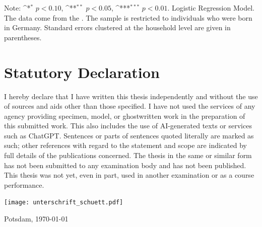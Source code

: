 \documentclass[a4paper, oneside, hyperfootnotes = false]{article}
\def\sym#1{\ifmmode^{#1}\else\(^{#1}\)\fi}
\begin{document}
{\begin{table}[ht]
\begin{center}
		\vspace{2mm}
		
		\parbox{10cm}{
			\linespread{1}\footnotesize Note: \sym{*} \(p<0.10\), \sym{**} \(p<0.05\), \sym{***} \(p<0.01\). Logistic Regression Model. The data come from the \cite{SOEP2023}. The sample is restricted to individuals who were born in Germany. Standard errors clustered at the household level are given in parentheses.}
		
	\end{center}
\end{table}

\clearpage

}
{\fontsize{11pt}{11pt}\selectfont

{}
\section*{Statutory Declaration}
\label{declarations}

I hereby declare that I have written this thesis independently and without the use of sources and aids other than those specified. I have not used the services of any agency providing specimen, model, or ghostwritten work in the preparation of this submitted work. This also includes the use of AI-generated texts or services such as ChatGPT. Sentences or parts of sentences quoted literally are marked as such; other references with regard to the statement and scope are indicated by full details of the publications concerned. The thesis in the same or similar form has not been submitted to any examination body and has not been published. This thesis was not yet, even in part, used in another examination or as a course performance.

\vspace{1.5cm}

\texttt{[image: unterschrift\_schuett.pdf]}

\noindent Potsdam, \today{}

} %
\end{document}
